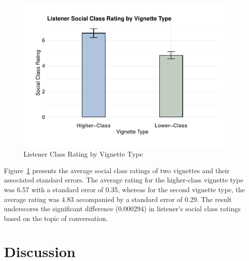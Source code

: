 \documentclass[
  man,floatsintext]{apa6}
\begin{document}
\begin{figure}
\centering
\includegraphics{sooyoun-pilot_files/figure-latex/bar-plot-listener-1.pdf}
\caption{\label{fig:bar-plot-listener}Listener Class Rating by Vignette Type}
\end{figure}

Figure~\ref{fig:bar-plot-listener} presents the average social class ratings of two vignettes and their associated standard errors. The average rating for the higher-class vignette type was 6.57 with a standard error of 0.35, whereas for the second vignette type, the average rating was 4.83 accompanied by a standard error of 0.29. The result underscores the significant difference (0.000294) in listener's social class ratings based on the topic of conversation.

\hypertarget{discussion}{%
\section{Discussion}\label{discussion}}
\end{document}

